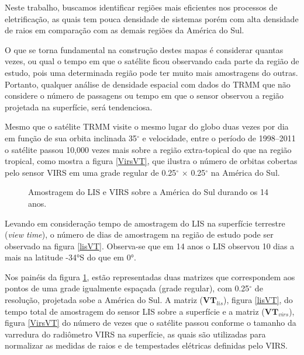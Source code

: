 Neste trabalho, buscamos identificar regiões mais eficientes nos processos de eletrificação, as quais tem pouca densidade de sistemas porém com alta densidade de raios em comparação com as demais regiões da América do Sul.

O que se torna fundamental na construção destes mapas é considerar quantas vezes, ou qual o tempo em que o satélite ficou observando cada parte da região de estudo, pois uma determinada região pode ter muito mais amostragens do outras. Portanto, qualquer análise de densidade espacial com dados do TRMM que não considere o número de passagens ou tempo em que o sensor observou a região projetada na superfície, será tendenciosa.

Mesmo que o satélite TRMM visite o mesmo lugar do globo duas vezes por dia em função de sua orbita inclinada 35$^{\circ}$ e velocidade, entre o período de 1998--2011 o satélite passou 10,000 vezes mais sobre a região extra-topical do que na região tropical, como mostra a figura \ref{VirsVT}, que ilustra o número de orbitas cobertas pelo sensor VIRS em uma grade regular de 0.25$^{\circ}$  $\times$ 0.25$^{\circ}$ na América do Sul.


\begin{figure}[!ht]
\caption{Amostragem do LIS e VIRS sobre a América do Sul durando os 14 anos.}
\label{gridAmostragem} 
\end{figure} 

Levando em consideração tempo de amostragem do LIS na superfície terrestre (\textit{view time}), o número de dias de amostragem na região de estudo pode ser observado na figura \ref{lisVT}. Observa-se que em 14 anos o LIS observou 10 dias a mais na latitude -34°S do que em 0°.

Nos painéis da figura  \ref{gridAmostragem}, estão representadas duas matrizes que correspondem aos pontos de uma grade igualmente espaçada (grade regular), com 0.25$^{\circ}$ de resolução, projetada sobe a América do Sul. A matriz ($\mathbf{VT}_{lis}$), figura \ref{lisVT}, do tempo total de amostragem do sensor LIS sobre a superfície e a matriz ($\mathbf{VT}_{virs}$), figura \ref{VirsVT} do número de vezes que o satélite passou conforme o tamanho da varredura do radiômetro VIRS na superfície, as quais são utilizadas para normalizar as medidas de raios e de tempestades elétricas definidas pelo VIRS.  

